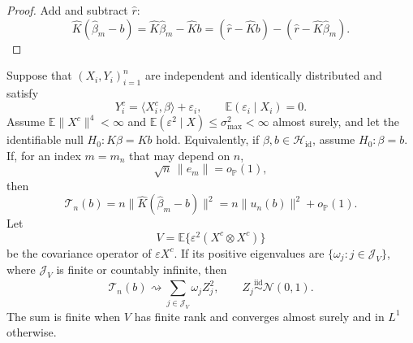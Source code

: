 \begin{proof}
Add and subtract $\widehat r$:
\[
 \widehat K(\widehat\beta_m-b)
 =\widehat K\widehat\beta_m-\widehat Kb
 =(\widehat r-\widehat Kb)
  -(\widehat r-\widehat K\widehat\beta_m).
\]
\end{proof}

\begin{theorem}
\label{thm:app-late-stopping}
Suppose that $(X_i,Y_i)_{i=1}^n$ are independent and identically distributed
and satisfy
\[
    Y_i^c=\langle X_i^c,\beta\rangle+\varepsilon_i,
    \qquad \mathbb E(\varepsilon_i\mid X_i)=0.
\]
Assume $\mathbb E\|X^c\|^4<\infty$ and
$\mathbb E(\varepsilon^2\mid X)\leq\sigma_{\max}^2<\infty$ almost surely,
and let the identifiable null
$H_0:K\beta=Kb$ hold.  Equivalently, if $\beta,b\in
\mathcal H_{\mathrm{id}}$, assume $H_0:\beta=b$.  If, for an index
$m=m_n$ that may depend on $n$,
\[
 \sqrt n\,\|e_m\|=o_{\mathbb P}(1),
\]
then
\[
 \mathcal T_n(b)
 =n\|\widehat K(\widehat\beta_m-b)\|^2
 =n\|u_n(b)\|^2+o_{\mathbb P}(1).
\]
Let
\[
    V=\mathbb E\{\varepsilon^2(X^c\otimes X^c)\}
\]
be the covariance operator of $\varepsilon X^c$.  If its positive
eigenvalues are $\{\omega_j:j\in\mathcal J_V\}$, where $\mathcal J_V$ is
finite or countably infinite, then
\[
 \mathcal T_n(b)\rightsquigarrow
 \sum_{j\in\mathcal J_V}\omega_jZ_j^2,
 \qquad Z_j\stackrel{\mathrm{iid}}{\sim}\mathcal N(0,1).
\]
The sum is finite when $V$ has finite rank and converges almost surely and
in $L^1$ otherwise.
\end{theorem}

